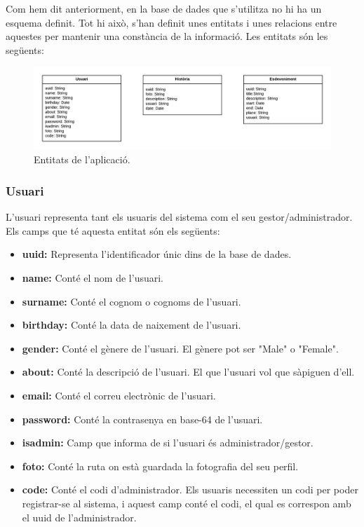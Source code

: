 \documentclass[11pt,catalan,listoffigures,listoftables]{tfgetsinf}
\begin{document}
Com hem dit anteriorment, en la base de dades que s'utilitza no hi ha un esquema definit. Tot hi això, s'han definit unes entitats i unes relacions entre aquestes per mantenir una constància de la informació. Les entitats són les següents:

\begin{figure}[h]
\includegraphics[width=15cm]{images/image6}
\centering
\caption[Figura 4.6]{Entitats de l'aplicació.}
\centering
\end{figure}
\newpage
\subsubsection{Usuari}

L'usuari representa tant els usuaris del sistema com el seu gestor/administrador. Els camps que té aquesta entitat són els següents:
\begin{itemize}
\item \textbf{uuid:} Representa l'identificador únic dins de la base de dades.
\item \textbf{name:} Conté el nom de l'usuari.
\item \textbf{surname:} Conté el cognom o cognoms de l'usuari.
\item \textbf{birthday:} Conté la data de naixement de l'usuari.
\item \textbf{gender:} Conté el gènere de l'usuari. El gènere pot ser "Male" o "Female".
\item \textbf{about:} Conté la descripció de l'usuari. El que l'usuari vol que sàpiguen d'ell.
\item \textbf{email:} Conté el correu electrònic de l'usuari.
\item \textbf{password:} Conté la contrasenya en base-64 de l'usuari.
\item \textbf{isadmin:} Camp que informa de si l'usuari és administrador/gestor.
\item \textbf{foto:} Conté la ruta on està guardada la fotografia del seu perfil.
\item \textbf{code:} Conté el codi d'administrador. Els usuaris necessiten un codi per poder registrar-se al sistema, i aquest camp conté el codi, el qual es correspon amb el uuid de l'administrador.
\end{itemize}
\end{document}
